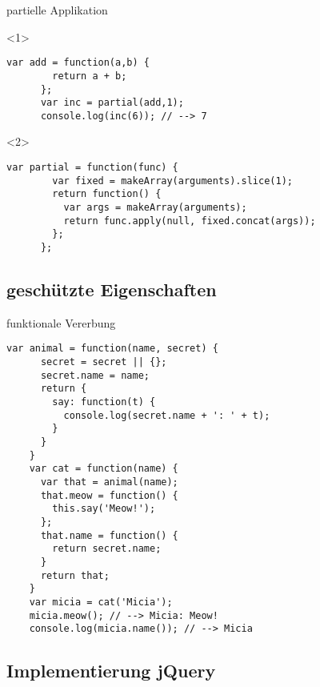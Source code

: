 \begin{frame}[fragile]{partielle Applikation}
  \begin{onlyenv}<1>
    \begin{lstlisting}[gobble=6]
      var add = function(a,b) {
        return a + b;
      };
      var inc = partial(add,1);
      console.log(inc(6)); // --> 7
    \end{lstlisting}
  \end{onlyenv}
  
  \begin{onlyenv}<2>
    \begin{lstlisting}[gobble=6]
      var partial = function(func) {
        var fixed = makeArray(arguments).slice(1);
        return function() {
          var args = makeArray(arguments);
          return func.apply(null, fixed.concat(args));
        };
      };
    \end{lstlisting}
  \end{onlyenv}
\end{frame}

\subsection{geschützte Eigenschaften}

\begin{frame}[fragile]{funktionale Vererbung}
  \begin{lstlisting}[gobble=4]
    var animal = function(name, secret) {
      secret = secret || {};
      secret.name = name;
      return {
        say: function(t) {
          console.log(secret.name + ': ' + t);
        }
      }
    }    
    var cat = function(name) {
      var that = animal(name);
      that.meow = function() {
        this.say('Meow!');
      };
      that.name = function() {
        return secret.name;
      }
      return that;
    }
    var micia = cat('Micia');
    micia.meow(); // --> Micia: Meow!
    console.log(micia.name()); // --> Micia
  \end{lstlisting}
\end{frame}

\subsection{Implementierung jQuery}


